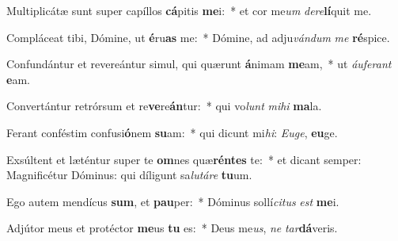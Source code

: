 \item Multiplicátæ sunt super capíllos \textbf{cá}pitis \textbf{me}i:~* et cor me\textit{um} \textit{de}\textit{re}\textbf{lí}quit me.
\item Compláceat tibi, Dómine, ut \textbf{é}ru\textbf{as} me:~* Dómine, ad adju\textit{ván}\textit{dum} \textit{me} \textbf{ré}spice.
\item Confundántur et revereántur simul, qui quærunt \textbf{á}nimam \textbf{me}am,~* ut \textit{áu}\textit{fe}\textit{rant} \textbf{e}am.
\item Convertántur retrórsum et re\textbf{ve}re\textbf{án}tur:~* qui vo\textit{lunt} \textit{mi}\textit{hi} \textbf{ma}la.
\item Ferant conféstim confusi\textbf{ó}nem \textbf{su}am:~* qui dicunt mi\textit{hi}: \textit{Eu}\textit{ge}, \textbf{eu}ge.
\item Exsúltent et læténtur super te \textbf{om}nes quæ\textbf{rén}\textbf{tes} te:~* et dicant semper: Magnificétur Dóminus: qui díligunt sa\textit{lu}\textit{tá}\textit{re} \textbf{tu}um.
\item Ego autem mendícus \textbf{sum}, et \textbf{pau}per:~* Dóminus sollí\textit{ci}\textit{tus} \textit{est} \textbf{me}i.
\item Adjútor meus et protéctor \textbf{me}us \textbf{tu} es:~* Deus me\textit{us}, \textit{ne} \textit{tar}\textbf{dá}veris.
